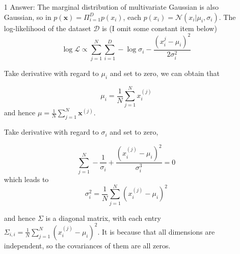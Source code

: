 \documentclass{article}
\begin{document}
\newpage
\begin{itemize}
\item[1] Answer: The marginal distribution of multivariate Gaussian is also Gaussian, so in $p(\mathbf{x}) = \Pi_{i=1}^D p(x_i)$, each $p(x_i)=\mathcal{N}(x_i|\mu_i, \sigma_i)$. The log-likelihood of the dataset $\mathcal{D}$ is (I omit some constant item below)
	$$\log \mathcal{L} \propto \sum_{j=1}^{N} \sum_{i=1}^D -\log\sigma_i - \frac{(x_i^{j}-\mu_i)^2}{2\sigma_i^2}$$
	
	Take derivative with regard to $\mu_i$ and set to zero, we can obtain that
	
	$$\mu_i = \frac{1}{N} \sum_{j=1}^N x_i^{(j)}$$
and hence $\mu = \frac{1}{N} \sum_{j=1}^N \mathbf{x}^{(j)}$.
	
	Take derivative with regard to $\sigma_i$ and set to zero,
	
	$$ \sum_{j=1}^{N}-\frac{1}{\sigma_i} + \frac{(x_i^{(j)}-\mu_i)^2}{\sigma_i^3} = 0$$
which leads to 
	$$\sigma_i^2 = \frac{1}{N} \sum_{j=1}^{N} (x_i^{(j)}-\mu_i)^2$$

and hence $\Sigma$ is a diagonal matrix, with each entry $\Sigma_{i,i} = \frac{1}{N} \sum_{j=1}^{N} (x_i^{(j)}-\mu_i)^2$. It is because that all dimensions are independent, so the covariances of them are all zeros.


\end{itemize}
\end{document}
